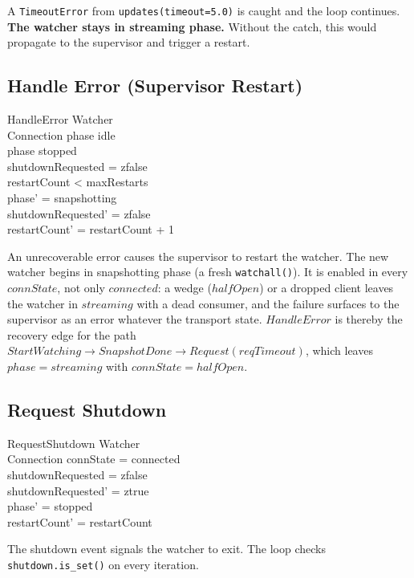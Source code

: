 \documentclass[a4paper,10pt,fleqn]{article}
\begin{document}
A \texttt{TimeoutError} from \texttt{updates(timeout=5.0)} is
caught and the loop continues.  \textbf{The watcher stays in
streaming phase.}  Without the catch, this would propagate to
the supervisor and trigger a restart.

\subsection{Handle Error (Supervisor Restart)}

\begin{schema}{HandleError}
  \Delta Watcher \\
  \Xi Connection
  \where
  phase \neq idle \\
  phase \neq stopped \\
  shutdownRequested = zfalse \\
  restartCount < maxRestarts \\
  phase' = snapshotting \\
  shutdownRequested' = zfalse \\
  restartCount' = restartCount + 1
\end{schema}

An unrecoverable error causes the supervisor to restart the
watcher.  The new watcher begins in snapshotting phase
(a fresh \texttt{watchall()}).  It is enabled in every $connState$,
not only $connected$: a wedge ($halfOpen$) or a dropped client leaves
the watcher in $streaming$ with a dead consumer, and the failure
surfaces to the supervisor as an error whatever the transport state.
$HandleError$ is thereby the recovery edge for the path
$StartWatching \to SnapshotDone \to Request(reqTimeout)$, which
leaves $phase = streaming$ with $connState = halfOpen$.

\subsection{Request Shutdown}

\begin{schema}{RequestShutdown}
  \Delta Watcher \\
  \Xi Connection
  \where
  connState = connected \\
  shutdownRequested = zfalse \\
  shutdownRequested' = ztrue \\
  phase' = stopped \\
  restartCount' = restartCount
\end{schema}

The shutdown event signals the watcher to exit.  The loop
checks \texttt{shutdown.is\_set()} on every iteration.
\end{document}
